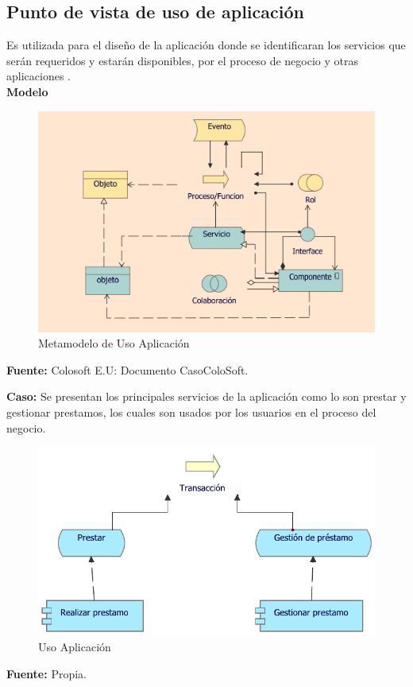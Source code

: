 	\subsection{Punto de vista de uso de aplicación}
	{Es utilizada para el diseño de la aplicación donde se identificaran los servicios que serán requeridos y estarán disponibles, por el proceso de negocio y otras aplicaciones \cite{archimate}.\\
		
		\textbf{Modelo}\\
		\begin{figure}[H]
			\centering
			\includegraphics[width=0.7\linewidth]{development/usoapp.png}
			\caption{Metamodelo de Uso Aplicación}
		\end{figure}
		\begin{center}
			\textbf{Fuente:} Colosoft E.U: Documento CasoColoSoft.
		\end{center}
		
		\textbf{Caso:} Se presentan los principales servicios de la aplicación como lo son prestar y gestionar prestamos, los cuales son usados por los usuarios en el proceso del negocio.\\
		
		\begin{figure}[H]
			\centering
			\includegraphics[width=0.8\linewidth]{development/usoapp.pdf}
			\caption{Uso Aplicación}
		\end{figure}
		\begin{center}
			\textbf{Fuente:} Propia.
		\end{center}
	}
	
